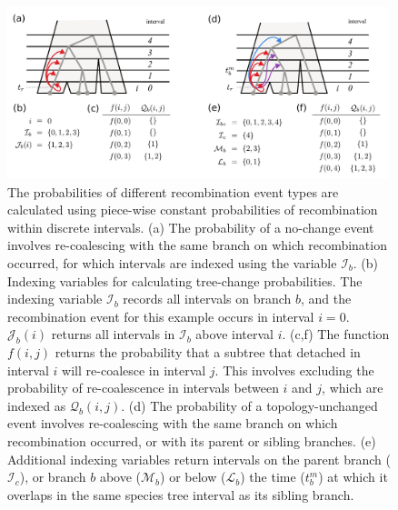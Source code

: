 \documentclass[11pt]{article}
\begin{document}
\begin{figure}[t]
	\centering
	\includegraphics[width=0.99\textwidth]{figures/interval-functions}
	\caption{
		The probabilities of different recombination event types are calculated using 
		piece-wise constant probabilities of recombination within discrete intervals.
		(a) The probability of a no-change event involves re-coalescing with the same 
		branch on which recombination occurred, for which intervals are indexed using
		the variable $\mathcal{I}_b$.
		(b) Indexing variables for calculating tree-change probabilities. The indexing 
		variable $\mathcal{I}_b$ records all intervals on branch $b$, and the 
		recombination event for this example occurs in interval $i=0$. $\mathcal{J}_b(i)$ 
		returns all intervals in $\mathcal{I}_b$ above interval $i$.
		(c,f) The function $f(i,j)$ returns the probability that a subtree that detached 
		in interval $i$ will re-coalesce in interval $j$. This involves excluding
		the probability of re-coalescence in intervals between $i$ and $j$, which are 
		indexed as $\mathcal{Q}_b(i,j)$. 
		(d) The probability of a topology-unchanged event involves re-coalescing with the 
		same branch on which recombination occurred, or with its parent or sibling branches. 
		(e) Additional indexing variables return intervals on the parent branch 
		($\mathcal{I}_c$), or branch $b$ above ($\mathcal{M}_b$) or below 
		($\mathcal{L}_b$) the time ($t_b^m$) at which it overlaps in the same species tree interval 
		as its sibling branch.
	}
	\label{fig:fig3}
\end{figure}
\end{document}
